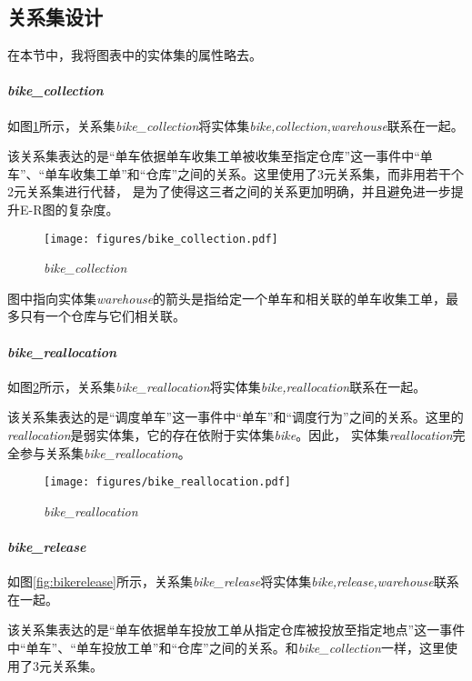 \subsection{关系集设计}
在本节中，我将图表中的实体集的属性略去。
\paragraph{\textit{bike\_collection}}
如图\ref{fig:bikecollection}所示，关系集\textit{bike\_collection}将实体集\textit{bike,collection,warehouse}联系在一起。

该关系集表达的是“单车依据单车收集工单被收集至指定仓库”这一事件中“单车”、“单车收集工单”和“仓库”之间的关系。这里使用了3元关系集，而非用若干个2元关系集进行代替，
是为了使得这三者之间的关系更加明确，并且避免进一步提升E-R图的复杂度\cite{dbconcept}。

\begin{figure}[htbp]
  \centering
  \texttt{[image: figures/bike\_collection.pdf]}
  \caption{\textit{bike\_collection}}
  \label{fig:bikecollection}
\end{figure}

图中指向实体集\textit{warehouse}的箭头是指给定一个单车和相关联的单车收集工单，最多只有一个仓库与它们相关联。
\paragraph{\textit{bike\_reallocation}}
如图\ref{fig:bikereallocation}所示，关系集\textit{bike\_reallocation}将实体集\textit{bike,reallocation}联系在一起。

该关系集表达的是“调度单车”这一事件中“单车”和“调度行为”之间的关系。这里的\textit{reallocation}是弱实体集，它的存在依附于实体集\textit{bike}。因此，
实体集\textit{reallocation}完全参与关系集\textit{bike\_reallocation}。

\begin{figure}[htbp]
  \centering
  \texttt{[image: figures/bike\_reallocation.pdf]}
  \caption{\textit{bike\_reallocation}}
  \label{fig:bikereallocation}
\end{figure}
\paragraph{\textit{bike\_release}}
如图\ref{fig:bikerelease}所示，关系集\textit{bike\_release}将实体集\textit{bike,release,warehouse}联系在一起。

该关系集表达的是“单车依据单车投放工单从指定仓库被投放至指定地点”这一事件中“单车”、“单车投放工单”和“仓库”之间的关系。和\textit{bike\_collection}一样，这里使用了3元关系集。

